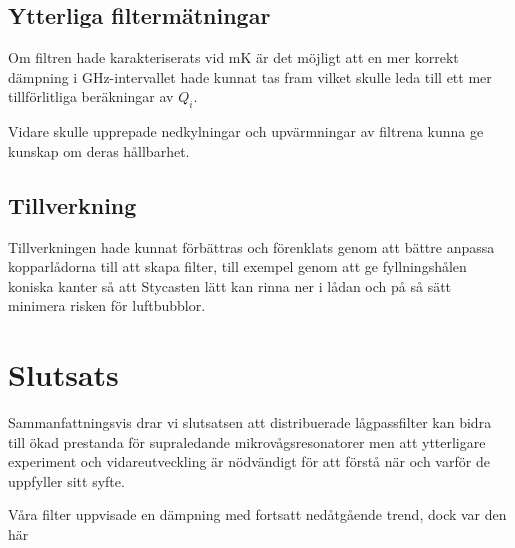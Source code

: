 \documentclass[main.tex]{subfiles}
\begin{document}
\subsection{Ytterliga filtermätningar}
Om filtren hade karakteriserats vid \unit[10]{mK} är det möjligt att en mer korrekt dämpning i \unit[4-8]{GHz}-intervallet hade kunnat tas fram vilket skulle leda till ett mer tillförlitliga beräkningar av $Q_i$.

Vidare skulle upprepade nedkylningar och upvärmningar av filtrena kunna ge kunskap om deras hållbarhet.

\subsection{Tillverkning}
Tillverkningen hade kunnat förbättras och förenklats genom att bättre anpassa kopparlådorna till att skapa filter, till exempel genom att ge fyllningshålen koniska kanter så att Stycasten lätt kan rinna ner i lådan och på så sätt minimera risken för luftbubblor.  

\section{Slutsats}
Sammanfattningsvis drar vi slutsatsen att distribuerade lågpassfilter kan bidra till ökad prestanda för supraledande mikrovågsresonatorer men att ytterligare experiment och vidareutveckling är nödvändigt för att förstå när och varför de uppfyller sitt syfte. 


Våra filter uppvisade en dämpning med fortsatt nedåtgående trend, dock var den här 
\end{document}
